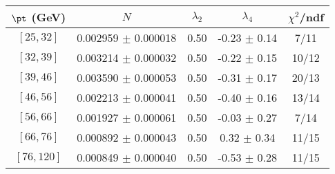\begin{tabular}{c||c|c|c|c}
$\pt$ (GeV) & $N$ & $\lambda_{2}$ & $\lambda_4$  & $\chi^2$/ndf  \\
\hline
$[25, 32]$ & 0.002959 $\pm$ 0.000018 & 0.50 & -0.23 $\pm$ 0.14 & 7/11\\
$[32, 39]$ & 0.003214 $\pm$ 0.000032 & 0.50 & -0.22 $\pm$ 0.15 & 10/12\\
$[39, 46]$ & 0.003590 $\pm$ 0.000053 & 0.50 & -0.31 $\pm$ 0.17 & 20/13\\
$[46, 56]$ & 0.002213 $\pm$ 0.000041 & 0.50 & -0.40 $\pm$ 0.16 & 13/14\\
$[56, 66]$ & 0.001927 $\pm$ 0.000061 & 0.50 & -0.03 $\pm$ 0.27 & 7/14\\
$[66, 76]$ & 0.000892 $\pm$ 0.000043 & 0.50 & 0.32 $\pm$ 0.34 & 11/15\\
$[76, 120]$ & 0.000849 $\pm$ 0.000040 & 0.50 & -0.53 $\pm$ 0.28 & 11/15\\
\end{tabular}
